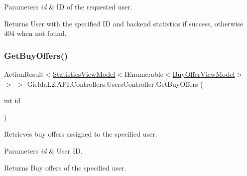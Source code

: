\begin{DoxyParams}{Parameters}
{\em id} & ID of the requested user.\\
\hline
\end{DoxyParams}
\begin{DoxyReturn}{Returns}
User with the specified ID and backend statistics if success, otherwise 404 when not found.
\end{DoxyReturn}
\mbox{\label{class_gielda_l2_1_1_a_p_i_1_1_controllers_1_1_users_controller_ac289d8e1c9c314d9326934f5e6ee7883}} 
\subsubsection{\texorpdfstring{GetBuyOffers()}{GetBuyOffers()}}
{\footnotesize\ttfamily Action\+Result$<$\mbox{\hyperlink{class_gielda_l2_1_1_a_p_i_1_1_view_models_1_1_view_1_1_statistics_view_model}{Statistics\+View\+Model}}$<$I\+Enumerable$<$\mbox{\hyperlink{class_gielda_l2_1_1_a_p_i_1_1_view_models_1_1_view_1_1_buy_offer_view_model}{Buy\+Offer\+View\+Model}}$>$ $>$ $>$ Gielda\+L2.\+A\+P\+I.\+Controllers.\+Users\+Controller.\+Get\+Buy\+Offers (\begin{DoxyParamCaption}\item[{int}]{id }\end{DoxyParamCaption})}



Retrieves buy offers assigned to the specified user. 


\begin{DoxyParams}{Parameters}
{\em id} & User ID.\\
\hline
\end{DoxyParams}
\begin{DoxyReturn}{Returns}
Buy offers of the specified user.
\end{DoxyReturn}
\mbox{\label{class_gielda_l2_1_1_a_p_i_1_1_controllers_1_1_users_controller_a05804a588ec44a3ee7bbfedd0397a68b}} 
